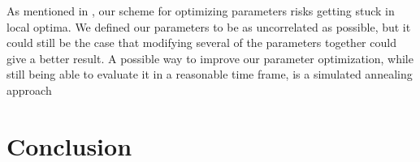 \documentclass[thesis.tex]{subfiles}
\begin{document}
As mentioned in , our scheme for optimizing parameters risks getting stuck in local optima. We defined our parameters to be as uncorrelated as possible, but it could still be the case that modifying several of the parameters together could give a better result. A possible way to improve our parameter optimization, while still being able to evaluate it in a reasonable time frame, is a simulated annealing approach

\section{Conclusion}

\subbibliography
\end{document}
